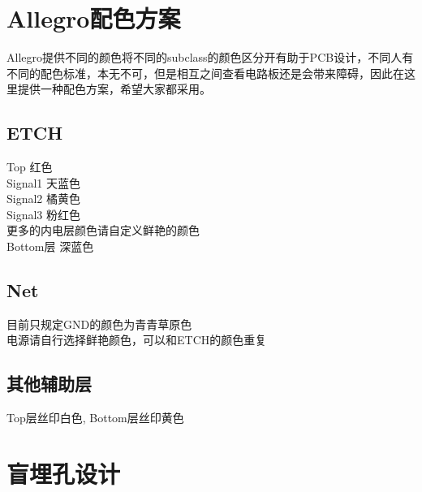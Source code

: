 \documentclass[a4paper,twoside]{article}
\begin{document}
\section{Allegro配色方案}
Allegro提供不同的颜色将不同的subclass的颜色区分开有助于PCB设计，不同人有不同的配色标准，本无不可，但是相互之间查看电路板还是会带来障碍，因此在这里提供一种配色方案，希望大家都采用。\\
\subsection{ETCH}
\begin{center}
\textcolor[rgb]{1,0,0}{Top 红色}\\
\textcolor[rgb]{0.13,0.8,0.94}{Signal1 天蓝色}\\
\textcolor[rgb]{1,0.5,0}{Signal2 橘黄色}\\
\textcolor[rgb]{1,0,1}{Signal3 粉红色}\\
更多的内电层颜色请自定义鲜艳的颜色\\
\textcolor[rgb]{0,0,1}{Bottom层 深蓝色}\\
\end{center}
\subsection{Net}
目前只规定\textcolor[rgb]{0,1,0}{GND}的颜色为\textcolor[rgb]{0,1,0}{青青草原色}\\
电源请自行选择鲜艳颜色，可以和ETCH的颜色重复
\subsection{其他辅助层}
\colorbox[rgb]{0.5,0.5,0.5}{\textcolor[rgb]{1,1,1}{Top层丝印白色}}, \colorbox[rgb]{0.5,0.5,0.5}{\textcolor[rgb]{1,1,0}{Bottom层丝印黄色}}
\section{盲埋孔设计}
\end{document}
